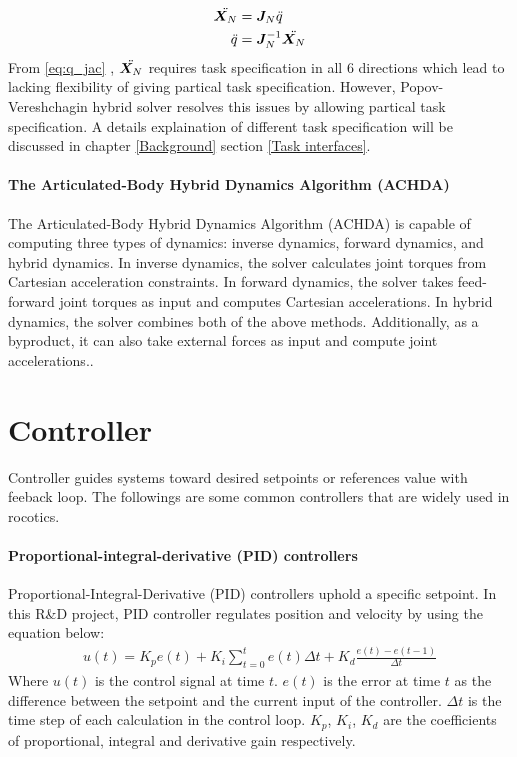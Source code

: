 \documentclass[report.tex]{subfiles}
\begin{document}
    \begin{align}
        \ddot{\bm{X_}N} &= \bm{J}_N \ddot{q}\\
        \label{eq:q_jac} \ddot{q} &= \bm{J}_N^{-1} \ddot{\bm{X_}N}
    \end{align}
    From \ref{eq:q_jac} , $\ddot{\bm{X_}N}$ requires task specification in all 6 directions which lead to lacking flexibility of giving partical task specification. However,  Popov-Vereshchagin hybrid solver resolves this issues by allowing partical task specification. A details explaination of different task specification will be discussed in chapter \ref{Background} section \ref{Task interfaces}.
    \raggedbottom
    \paragraph*{\large{The Articulated-Body Hybrid Dynamics Algorithm (ACHDA)}\\}
    The Articulated-Body Hybrid Dynamics Algorithm (ACHDA) is capable of computing three types of dynamics: inverse dynamics, forward dynamics, and hybrid dynamics. In inverse dynamics, the solver calculates joint torques from Cartesian acceleration constraints. In forward dynamics, the solver takes feed-forward joint torques as input and computes Cartesian accelerations. In hybrid dynamics, the solver combines both of the above methods. Additionally, as a byproduct, it can also take external forces as input and compute joint accelerations.\cite{featherstone2007book}.

    \section{Controller}
    \label{Controller}
    Controller guides systems toward desired setpoints or references value with feeback loop. The followings are some common controllers that are widely used in rocotics.
    \paragraph*{\large{Proportional-integral-derivative (PID) controllers}\\}
    Proportional-Integral-Derivative (PID) controllers uphold a specific setpoint. In this R\&D project, PID controller regulates position and velocity by using the equation below:
    \begin{align}
        u(t) = K_pe(t) + K_i\sum_{t=0}^{t} e(t) \Delta{t} + K_d \frac{e(t)-e(t-1)}{\Delta{t}}
    \end{align}
    Where $u(t)$ is the control signal at time $t$. $e(t)$ is the error at time $t$ as the difference between the setpoint and the current input of the controller. $\Delta{t}$ is the time step of each calculation in the control loop. $K_p$, $K_i$, $K_d$ are the coefficients of proportional, integral and derivative gain respectively\cite{johnson2005pid}.
\end{document}
